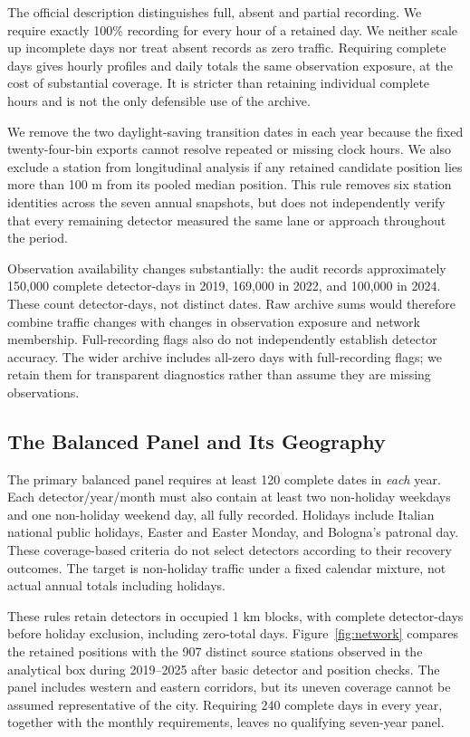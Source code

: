 \documentclass[]{interact}
\begin{document}
The official description distinguishes full, absent and partial recording. We require exactly 100\%{} recording for every hour of a retained day. We neither scale up incomplete days nor treat absent records as zero traffic. Requiring complete days gives hourly profiles and daily totals the same observation exposure, at the cost of substantial coverage. It is stricter than retaining individual complete hours and is not the only defensible use of the archive.

We remove the two daylight-saving transition dates in each year because the fixed twenty-four-bin exports cannot resolve repeated or missing clock hours. We also exclude a station from longitudinal analysis if any retained candidate position lies more than 100 m from its pooled median position. This rule removes six station identities across the seven annual snapshots, but does not independently verify that every remaining detector measured the same lane or approach throughout the period.

Observation availability changes substantially: the audit records approximately 150,000 complete detector-days in 2019, 169,000 in 2022, and 100,000 in 2024. These count detector-days, not distinct dates. Raw archive sums would therefore combine traffic changes with changes in observation exposure and network membership. Full-recording flags also do not independently establish detector accuracy. The wider archive includes all-zero days with full-recording flags; we retain them for transparent diagnostics rather than assume they are missing observations.

\subsection{The Balanced Panel and Its Geography}
The primary balanced panel requires at least 120 complete dates in \emph{each} year. Each detector/year/month must also contain at least two non-holiday weekdays and one non-holiday weekend day, all fully recorded. Holidays include Italian national public holidays, Easter and Easter Monday, and Bologna's patronal day. These coverage-based criteria do not select detectors according to their recovery outcomes. The target is non-holiday traffic under a fixed calendar mixture, not actual annual totals including holidays.

These rules retain \PanelSites{} detectors in \PanelBlocks{} occupied 1 km blocks, with \PanelDays{} complete detector-days before holiday exclusion, including \ZeroPanelDays{} zero-total days. Figure~\ref{fig:network} compares the retained positions with the 907 distinct source stations observed in the analytical box during 2019--2025 after basic detector and position checks. The panel includes western and eastern corridors, but its uneven coverage cannot be assumed representative of the city. Requiring 240 complete days in every year, together with the monthly requirements, leaves no qualifying seven-year panel.
\end{document}
